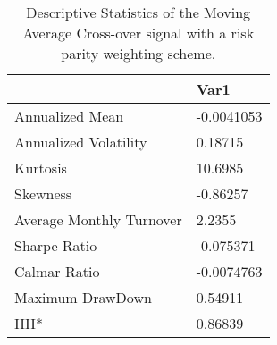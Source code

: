 \begin{table}[H]
\centering
\begin{tabular}{ll}
& Var1 \\ 
\hline 
Annualized Mean & -0.0041053 \\ 
Annualized Volatility & 0.18715 \\ 
Kurtosis & 10.6985 \\ 
Skewness & -0.86257 \\ 
Average Monthly Turnover & 2.2355 \\ 
Sharpe Ratio & -0.075371 \\ 
Calmar Ratio & -0.0074763 \\ 
Maximum DrawDown & 0.54911 \\ 
HH* & 0.86839 \\ 
\hline
\end{tabular}
\caption{Descriptive Statistics of the Moving Average Cross-over signal with a risk parity weighting scheme.}
\label{MARP}
\end{table}